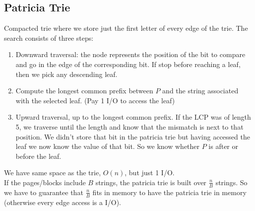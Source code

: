 \documentclass[10pt]{report}
\begin{document}
\subsection{Patricia Trie} Compacted trie where we store just the first letter of every edge of the trie. The search consists of three steps:
\begin{enumerate}
	\item Downward traversal: the node represents the position of the bit to compare and go in the edge of the corresponding bit. If stop before reaching a leaf, then we pick any descending leaf.
	\item Compute the longest common prefix between $P$ and the string associated with the selected leaf. (Pay 1 I/O to access the leaf)
	\item Upward traversal, up to the longest common prefix. If the LCP was of length 5, we traverse until the length and know that the mismatch is next to that position. We didn't store that bit in the patricia trie but having accessed the leaf we now know the value of that bit. So we know whether $P$ is after or before the leaf.
\end{enumerate}
We have same space as the trie, $O(n)$, but just 1 I/O.\\
If the pages/blocks include $B$ strings, the patricia trie is built over $\frac{n}{B}$ strings. So we have to guarantee that $\frac{n}{B}$ fits in memory to have the patricia trie in memory (otherwise every edge access is a I/O).
\end{document}
